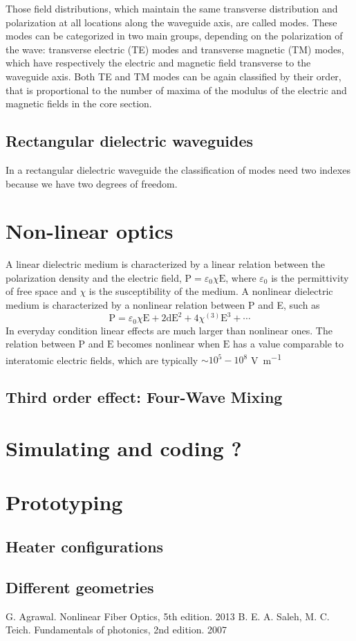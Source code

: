 \documentclass[12pt,a4paper]{article}
\begin{document}
Those field distributions, which maintain the same transverse distribution and polarization at all locations along the waveguide axis, are called modes.
These modes can be categorized in two main groups, depending on the polarization of the wave: transverse electric (TE) modes and transverse magnetic (TM) modes, which have respectively the electric and magnetic field transverse to the waveguide axis.
Both TE and TM modes can be again classified by their order, that is proportional to the number of maxima of the modulus of the electric and magnetic fields in the core section.


\subsection{Rectangular dielectric waveguides}
In a rectangular dielectric waveguide the classification of modes need two indexes because we have two degrees of freedom.

\section{Non-linear optics}
A linear dielectric medium is characterized by a linear relation between the polarization density and the electric field, $\mathrm{P} = \varepsilon_0 \chi \mathrm{E}$, where $\varepsilon_0$ is the permittivity of free space and $\chi$ is the susceptibility of the medium.
A nonlinear dielectric medium is characterized by a nonlinear relation between P and E, such as
$$\mathrm{P} = \varepsilon_0\chi \mathrm{E} + 2\mathrm{d}\mathrm{E}^2 + 4\chi^{(3)}\mathrm{E}^3 + \cdots$$
In everyday condition linear effects are much larger than nonlinear ones.
The relation between $\mathrm{P}$ and $\mathrm{E}$ becomes nonlinear when $\mathrm{E}$ has a value comparable to interatomic electric fields, which are typically $\sim 10^5-10^8$ \si{\V\per\m}
\subsection{Third order effect: Four-Wave Mixing}

\section{Simulating and coding ?}

\section{Prototyping}
\subsection{Heater configurations}
\subsection{Different geometries}

\newpage
\begin{thebibliography}{9}
 G. Agrawal. Nonlinear Fiber Optics, 5th edition. 2013
 B. E. A. Saleh, M. C. Teich. Fundamentals of photonics, 2nd edition. 2007
\end{thebibliography}
\end{document}
